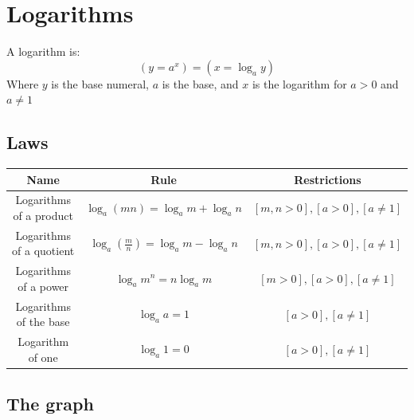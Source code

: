 \documentclass{report}
\begin{document}
\section{Logarithms}
A logarithm is:
$$
	(y = a^x) = (x = \log_ay)
$$
Where $y$ is the base numeral, $a$ is the base, and $x$ is the logarithm for $a > 0$ and $a \not = 1$

\subsection{Laws}
\begin{center}
	\begin{tabular}{c|c|c}
		Name                     & Rule                                      & Restrictions                        \\ \hline
		Logarithms of a product  & $\log_a(mn) = \log_am + \log_an$          & $[m, n > 0], [a > 0], [a \not = 1]$ \\
		Logarithms of a quotient & $\log_a(\frac{m}{n}) = \log_am - \log_an$ & $[m, n > 0], [a > 0], [a \not = 1]$ \\
		Logarithms of a power    & $\log_am^n = n\log_am$                    & $[m > 0], [a > 0], [a \not = 1]$    \\
		Logarithms of the base   & $\log_aa = 1$                             & $[a > 0], [a \not = 1]$             \\
		Logarithm of one         & $\log_a 1 = 0$                            & $[a > 0], [a \not = 1]$
	\end{tabular}
\end{center}

\subsection{The graph}
\end{document}
